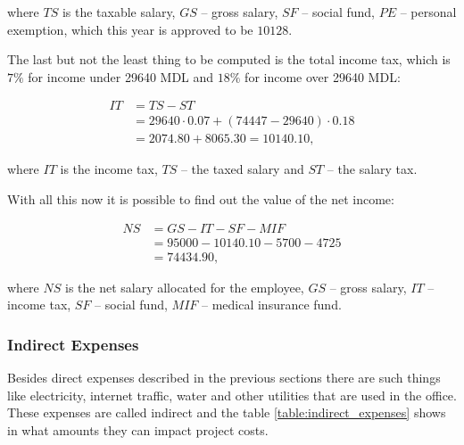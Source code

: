 \noindent where $TS$ is the taxable salary, $GS$ -- gross salary, $SF$ -- social
fund, $PE$ -- personal exemption, which this year is approved to be $10128$.

The last but not the least thing to be computed is the total income tax, which
is $7\%$ for income under 29640 MDL and $18\%$ for income over 29640 MDL:

\begin{equation}
\begin{split}
 IT &= TS - ST \\
      &= 29640 \cdot 0.07 + (74447 - 29640) \cdot 0.18 \\
      & = 2074.80 + 8065.30 = 10140.10,
 \end{split}
\end{equation}

\noindent where $IT$ is the income tax, $TS$ -- the taxed salary and $ST$ --
the salary tax.

With all this now it is possible to find out the value of the net income:

\begin{equation}
\begin{split}
 NS &= GS - IT - SF - MIF \\
            &= 95000 - 10140.10 - 5700 - 4725 \\
            &= 74434.90,
\end{split}
\end{equation}

\noindent where $NS$ is the net salary allocated for the employee, $GS$ -- gross
salary, $IT$ -- income tax, $SF$ -- social fund, $MIF$ -- medical insurance
fund.


\subsubsection{Indirect Expenses}

Besides direct expenses described in the previous sections there are such
things like electricity, internet traffic, water and other utilities that are
used in the office. These expenses are called indirect and the table
\ref{table:indirect_expenses} shows in what amounts they can impact project
costs.

